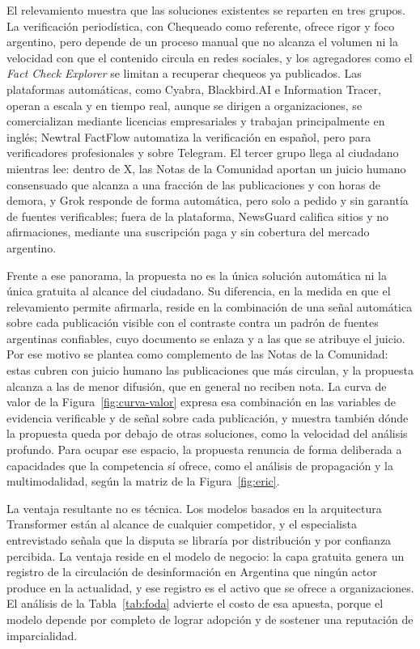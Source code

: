 El relevamiento muestra que las soluciones existentes se reparten en tres grupos. La verificación periodística, con Chequeado como referente, ofrece rigor y foco argentino, pero depende de un proceso manual que no alcanza el volumen ni la velocidad con que el contenido circula en redes sociales, y los agregadores como el \textit{Fact Check Explorer} se limitan a recuperar chequeos ya publicados. Las plataformas automáticas, como Cyabra, Blackbird.AI e Information Tracer, operan a escala y en tiempo real, aunque se dirigen a organizaciones, se comercializan mediante licencias empresariales y trabajan principalmente en inglés; Newtral FactFlow automatiza la verificación en español, pero para verificadores profesionales y sobre Telegram. El tercer grupo llega al ciudadano mientras lee: dentro de X, las Notas de la Comunidad aportan un juicio humano consensuado que alcanza a una fracción de las publicaciones y con horas de demora, y Grok responde de forma automática, pero solo a pedido y sin garantía de fuentes verificables; fuera de la plataforma, NewsGuard califica sitios y no afirmaciones, mediante una suscripción paga y sin cobertura del mercado argentino.

Frente a ese panorama, la propuesta no es la única solución automática ni la única gratuita al alcance del ciudadano. Su diferencia, en la medida en que el relevamiento permite afirmarla, reside en la combinación de una señal automática sobre cada publicación visible con el contraste contra un padrón de fuentes argentinas confiables, cuyo documento se enlaza y a las que se atribuye el juicio. Por ese motivo se plantea como complemento de las Notas de la Comunidad: estas cubren con juicio humano las publicaciones que más circulan, y la propuesta alcanza a las de menor difusión, que en general no reciben nota. La curva de valor de la Figura~\ref{fig:curva-valor} expresa esa combinación en las variables de evidencia verificable y de señal sobre cada publicación, y muestra también dónde la propuesta queda por debajo de otras soluciones, como la velocidad del análisis profundo. Para ocupar ese espacio, la propuesta renuncia de forma deliberada a capacidades que la competencia sí ofrece, como el análisis de propagación y la multimodalidad, según la matriz de la Figura~\ref{fig:eric}.

La ventaja resultante no es técnica. Los modelos basados en la arquitectura Transformer están al alcance de cualquier competidor, y el especialista entrevistado señala que la disputa se libraría por distribución y por confianza percibida. La ventaja reside en el modelo de negocio: la capa gratuita genera un registro de la circulación de desinformación en Argentina que ningún actor produce en la actualidad, y ese registro es el activo que se ofrece a organizaciones. El análisis de la Tabla~\ref{tab:foda} advierte el costo de esa apuesta, porque el modelo depende por completo de lograr adopción y de sostener una reputación de imparcialidad.

